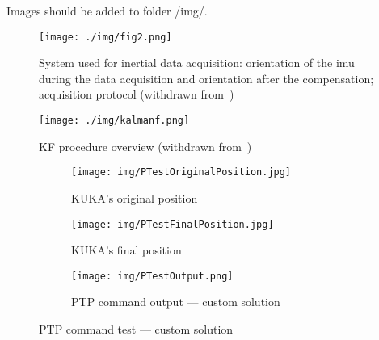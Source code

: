 Images should be added to folder /img/.


\begin{figure*} 
\centering
    \texttt{[image: ./img/fig2.png]}
  \caption{System used for inertial
    data acquisition: orientation of the \gls{imu} during the data acquisition
    and orientation after the compensation; acquisition protocol (withdrawn from~\cite{cav-enunc})}%
\label{fig:fig2}
\end{figure*}

\begin{figure}
\centering
    \texttt{[image: ./img/kalmanf.png]}
  \caption{KF procedure overview (withdrawn from~\cite{mccarron2013low})}%
\label{fig:kalmanf}
\end{figure}

\begin{figure}[htb!]
  \centering
  \begin{subfigure}{.4\textwidth}
  \texttt{[image: img/PTestOriginalPosition.jpg]}%
  \caption{KUKA's original position}%
  \label{fig:ptp-test-orig}
\end{subfigure}
%
  \begin{subfigure}{.20\textwidth}
    \texttt{[image: img/PTestFinalPosition.jpg]}%
  \caption{KUKA's final position}%
  \label{fig:ptp-test-final}
  \end{subfigure}
%
  \begin{subfigure}{.38\textwidth}
    \texttt{[image: img/PTestOutput.png]}%
  \caption{PTP command output --- custom solution}%
  \label{fig:ptp-test-out}
  \end{subfigure}
  \caption{PTP command test --- custom solution}%
  \label{fig:ptp-test}
\end{figure}


